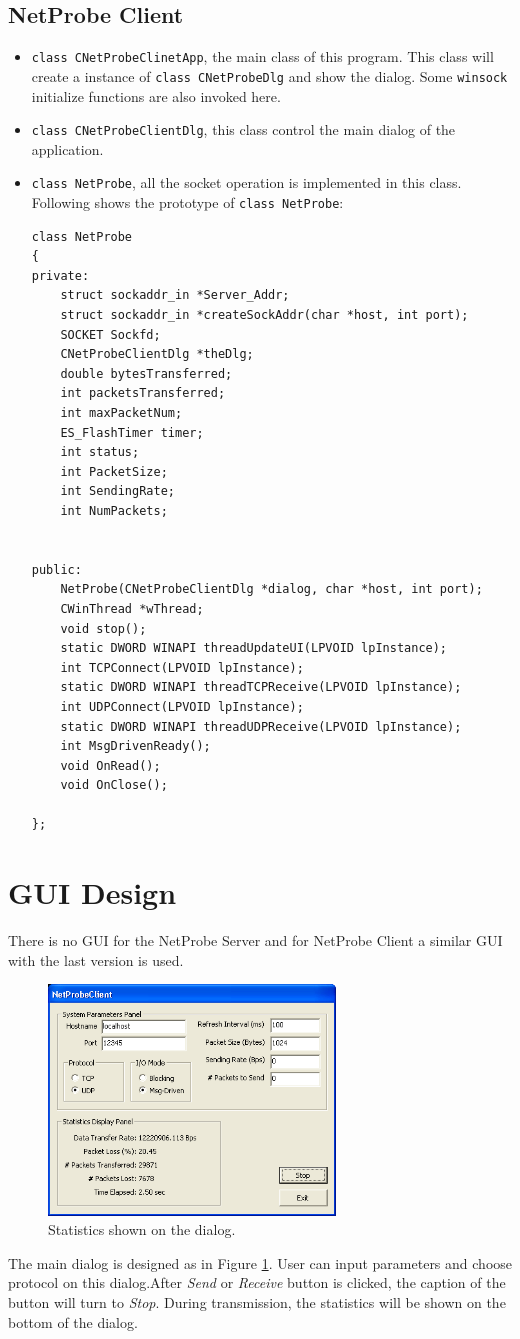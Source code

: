 \documentclass[11pt]{article}
\begin{document}
\subsection{NetProbe Client}
\begin{itemize}
\item {\tt class CNetProbeClinetApp}, the main class of this program. This class will create a instance of {\tt class CNetProbeDlg} and show the dialog. Some {\tt winsock} initialize functions are also invoked here.
\item {\tt class CNetProbeClientDlg}, this class control the main dialog of the application. 
\item {\tt class NetProbe}, all the socket operation is implemented in this class. Following shows the prototype of {\tt class NetProbe}:
\begin{lstlisting}
class NetProbe
{
private: 
	struct sockaddr_in *Server_Addr;
	struct sockaddr_in *createSockAddr(char *host, int port);
	SOCKET Sockfd;
	CNetProbeClientDlg *theDlg;
	double bytesTransferred;
	int packetsTransferred;
	int maxPacketNum;
	ES_FlashTimer timer;
	int status;
	int PacketSize;
	int SendingRate;
	int NumPackets;


public:
	NetProbe(CNetProbeClientDlg *dialog, char *host, int port);
	CWinThread *wThread;
	void stop();
	static DWORD WINAPI threadUpdateUI(LPVOID lpInstance);
	int TCPConnect(LPVOID lpInstance);
	static DWORD WINAPI threadTCPReceive(LPVOID lpInstance);
	int UDPConnect(LPVOID lpInstance);
	static DWORD WINAPI threadUDPReceive(LPVOID lpInstance);
	int MsgDrivenReady();
	void OnRead();
	void OnClose();
	
};
\end{lstlisting}
\end{itemize}
\section{GUI Design}
There is no GUI for the NetProbe Server and for NetProbe Client a similar GUI with the last version is used.
\begin{figure}
\centering
\includegraphics[width=3in]{work.png}
\caption{Statistics shown on the dialog.}
\label{fig:work}
\end{figure}
The main dialog is designed as in Figure \ref{fig:work}. User can input parameters and choose protocol on this dialog.After {\em Send} or {\em Receive} button is clicked, the caption of the button will turn to {\em Stop}. During transmission, the statistics will be shown on the bottom of the dialog.
\end{document}
